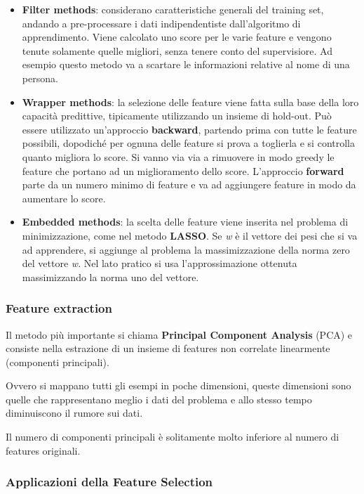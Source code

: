 \begin{itemize}
\item
  \textbf{Filter methods}: considerano caratteristiche generali del
  training set, andando a pre-processare i dati indipendentiste
  dall'algoritmo di apprendimento. Viene calcolato uno score per le
  varie feature e vengono tenute solamente quelle migliori, senza tenere
  conto del supervisiore. Ad esempio questo metodo va a scartare le
  informazioni relative al nome di una persona.
\item
  \textbf{Wrapper methods}: la selezione delle feature viene fatta sulla
  base della loro capacità predittive, tipicamente utilizzando un
  insieme di hold-out. Può essere utilizzato un'approccio
  \textbf{backward}, partendo prima con tutte le feature possibili,
  dopodiché per ognuna delle feature si prova a toglierla e si controlla
  quanto migliora lo score. Si vanno via via a rimuovere in modo greedy
  le feature che portano ad un miglioramento dello score. L'approccio
  \textbf{forward} parte da un numero minimo di feature e va ad
  aggiungere feature in modo da aumentare lo score.
\item
  \textbf{Embedded methods}: la scelta delle feature viene inserita nel
  problema di minimizzazione, come nel metodo \textbf{LASSO}. Se
  \emph{w} è il vettore dei pesi che si va ad apprendere, si aggiunge al
  problema la massimizzazione della norma zero del vettore \emph{w}. Nel
  lato pratico si usa l'approssimazione ottenuta massimizzando la norma
  uno del vettore.
\end{itemize}

\subsubsection{Feature extraction}\label{feature-extraction}

Il metodo più importante si chiama \textbf{Principal Component Analysis}
(PCA) e consiste nella estrazione di un insieme di features non
correlate linearmente (componenti principali).

Ovvero si mappano tutti gli esempi in poche dimensioni, queste
dimensioni sono quelle che rappresentano meglio i dati del problema e
allo stesso tempo diminuiscono il rumore sui dati.

Il numero di componenti principali è solitamente molto inferiore al
numero di features originali.

\subsubsection{Applicazioni della Feature Selection}\label{applicazioni-della-feature-selection}

